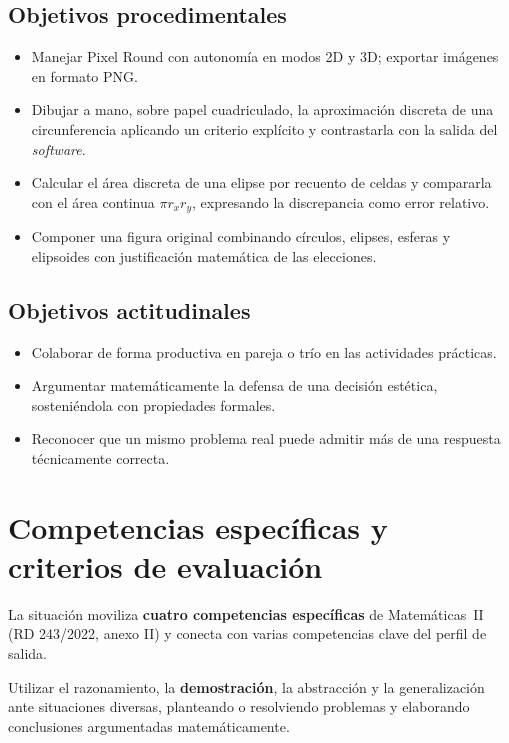\documentclass[12pt,a4paper]{scrartcl}
\newcommand{\acc}[1]{\textcolor{accent}{\textbf{#1}}}
\begin{document}
\subsection{Objetivos procedimentales}

\begin{itemize}[leftmargin=1.3em,itemsep=0.15em,topsep=0.3em]
  \item Manejar Pixel Round con autonomía en modos 2D y 3D; exportar imágenes en formato PNG.
  \item Dibujar a mano, sobre papel cuadriculado, la aproximación discreta de una circunferencia aplicando un criterio explícito y contrastarla con la salida del \emph{software}.
  \item Calcular el área discreta de una elipse por recuento de celdas y compararla con el área continua $\pi r_x r_y$, expresando la discrepancia como error relativo.
  \item Componer una figura original combinando círculos, elipses, esferas y elipsoides con justificación matemática de las elecciones.
\end{itemize}

\subsection{Objetivos actitudinales}

\begin{itemize}[leftmargin=1.3em,itemsep=0.15em,topsep=0.3em]
  \item Colaborar de forma productiva en pareja o trío en las actividades prácticas.
  \item Argumentar matemáticamente la defensa de una decisión estética, sosteniéndola con propiedades formales.
  \item Reconocer que un mismo problema real puede admitir más de una respuesta técnicamente correcta.
\end{itemize}

\section{Competencias específicas y criterios de evaluación}

La situación moviliza \acc{cuatro competencias específicas} de Matemáticas~II (RD 243/2022, anexo II) y conecta con varias competencias clave del perfil de salida.

\begin{competencia}
Utilizar el razonamiento, la \acc{demostración}, la abstracción y la generalización ante situaciones diversas, planteando o resolviendo problemas y elaborando conclusiones argumentadas matemáticamente.
\end{competencia}
\end{document}

